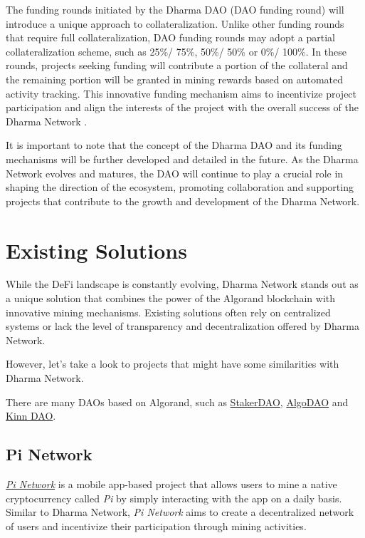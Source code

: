The funding rounds initiated by the Dharma DAO (DAO funding round) will introduce a unique approach to collateralization. Unlike other funding rounds that require full collateralization, DAO funding rounds may adopt a partial collateralization scheme, such as 25\%/ 75\%, 50\%/ 50\% or 0\%/ 100\%. In these rounds, projects seeking funding will contribute a portion of the collateral and the remaining portion will be granted in mining rewards based on automated activity tracking. This innovative funding mechanism aims to incentivize project participation and align the interests of the project with the overall success of the Dharma Network \cite{dharma}.\newline

It is important to note that the concept of the Dharma DAO and its funding mechanisms will be further developed and detailed in the future. As the Dharma Network evolves and matures, the DAO will continue to play a crucial role in shaping the direction of the ecosystem, promoting collaboration and supporting projects that contribute to the growth and development of the Dharma Network.\newline

\section{Existing Solutions}

While the DeFi landscape is constantly evolving, Dharma Network stands out as a unique solution that combines the power of the Algorand blockchain with innovative mining mechanisms. Existing solutions often rely on centralized systems or lack the level of transparency and decentralization offered by Dharma Network.\newline

However, let's take a look to projects that might have some similarities with Dharma Network.\newline

There are many DAOs based on Algorand, such as \href{https://algorand.com/pt/ecosystem/use-cases/staker-dao}{StakerDAO}, \href{https://algodao.fi}{AlgoDAO} and \href{https://www.algorand.foundation/news/kinn-grant-award}{Kinn DAO}. 

\subsection{Pi Network}

\href{https://minepi.com}{\textit{Pi Network}} is a mobile app-based project that allows users to mine a native cryptocurrency called \textit{Pi} by simply interacting with the app on a daily basis. Similar to Dharma Network, \textit{Pi Network} aims to create a decentralized network of users and incentivize their participation through mining activities. 

